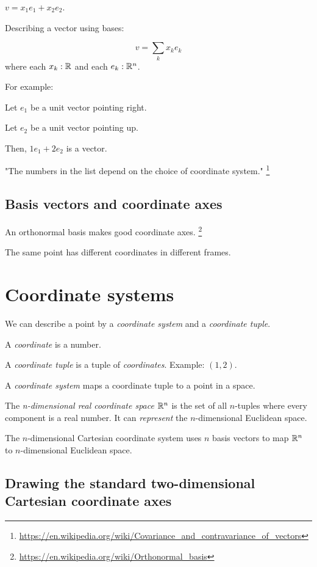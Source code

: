 \( v = x_1 e_1 + x_2 e_2 \).

Describing a vector using bases:

\[
v = \sum_k x_k e_k
\]
where each \(x_k:\mathbb{R}\) and each \(e_k:\mathbb{R}^n\).

For example:

Let \( e_1 \) be a unit vector pointing right.

Let \( e_2 \) be a unit vector pointing up.

Then, \( 1 e_1 + 2 e_2 \) is a vector.

"The numbers in the list depend on the choice of coordinate system."%
\footnote{\url{https://en.wikipedia.org/wiki/Covariance_and_contravariance_of_vectors}}

\subsection{Basis vectors and coordinate axes}

An orthonormal basis makes good coordinate axes.%
\footnote{\url{https://en.wikipedia.org/wiki/Orthonormal_basis}}

The same point has different coordinates in different frames.

\section{Coordinate systems}

We can describe a point by a \emph{coordinate system} and a \emph{coordinate tuple}.

%
A \emph{coordinate} is a number.

%
A \emph{coordinate tuple} is a tuple of \emph{coordinates}.
Example: \((1,2)\).

%
A \emph{coordinate system} maps a coordinate tuple to a point in a space.

%
The \emph{n-dimensional real coordinate space} \( \mathbb{R}^n \)
is the set of all \(n\)-tuples where every component is a real number.
It can \emph{represent} the \(n\)-dimensional Euclidean space.

The \(n\)-dimensional Cartesian coordinate system uses \(n\) basis vectors
to map \( \mathbb{R}^n \) to \(n\)-dimensional Euclidean space.

\subsection{Drawing the standard two-dimensional Cartesian coordinate axes}

